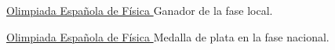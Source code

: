 \divider

\cvachievement{\faTrophy}
{\href{https://rsef.es/olimpiada-espanola-de-fisica}
  {Olimpiada Española de Física \smallskip}}
{\small {}%
  \small{}}
Ganador de la fase local.

\divider

\cvachievement{\faTrophy}
{\href{https://rsef.es/olimpiada-espanola-de-fisica}
  {Olimpiada Española de Física \smallskip}}
{\small{}%
  \small{}}
Medalla de plata en la fase nacional.
